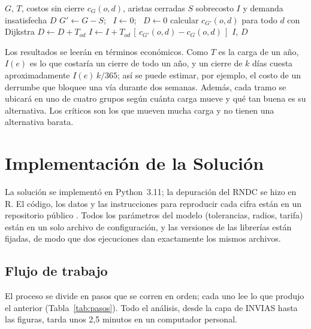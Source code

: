 \documentclass[conference]{IEEEtran}
\begin{document}
\begin{algorithm}[t]
\caption{Simulación del cierre de un conjunto de aristas $S$}
\label{alg:cierres}
\begin{algorithmic}[1]
\Require $G$, $T$, costos sin cierre $c_G(o,d)$, aristas cerradas $S$
\Ensure sobrecosto $I$ y demanda insatisfecha $D$
\State $G' \gets G - S$; \ $I \gets 0$; \ $D \gets 0$
    \State calcular $c_{G'}(o,d)$ para todo $d$ con Dijkstra
            \State $D \gets D + T_{od}$ 
        \Else
            \State $I \gets I + T_{od}\,[\,c_{G'}(o,d)-c_G(o,d)\,]$
        \EndIf
    \EndFor
\EndFor
\State \Return $I$, $D$
\end{algorithmic}
\end{algorithm}

Los resultados se leerán en términos económicos. Como $T$ es la carga de un
año, $I(e)$ es lo que costaría un cierre de todo un año, y un cierre de $k$
días cuesta aproximadamente $I(e)\,k/365$; así se puede estimar, por ejemplo,
el costo de un derrumbe que bloquee una vía durante dos semanas. Además, cada
tramo se ubicará en uno de cuatro grupos según cuánta carga mueve y qué tan
buena es su alternativa. Los críticos son los que mueven mucha carga y no
tienen una alternativa barata.

\section{Implementación de la Solución}
\label{sec:implementacion}

La solución se implementó en Python~3.11; la depuración del RNDC se hizo en R.
El código, los datos y las instrucciones para reproducir cada cifra están en
un repositorio público \cite{repositorio}. Todos los parámetros del modelo
(tolerancias, radios, tarifa) están en un solo archivo de configuración, y las
versiones de las librerías están fijadas, de modo que dos ejecuciones dan
exactamente los mismos archivos.

\subsection{Flujo de trabajo}
El proceso se divide en pasos que se corren en orden; cada uno lee lo que
produjo el anterior (Tabla~\ref{tab:pasos}). Todo el análisis, desde la capa
de INVIAS hasta las figuras, tarda unos 2,5 minutos en un computador personal.
\end{document}
